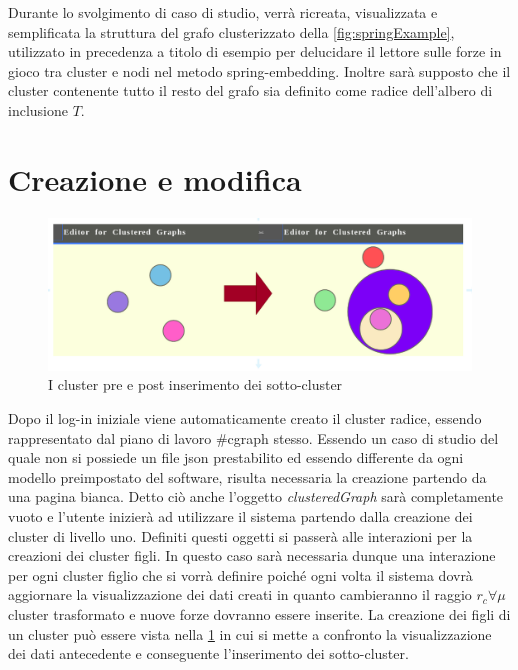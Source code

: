 \large{
Durante lo svolgimento di caso di studio, verrà ricreata, visualizzata e semplificata la struttura del grafo clusterizzato della \figurename{\ref{fig:springExample}}, utilizzato in precedenza a titolo di esempio per delucidare il lettore sulle forze in gioco tra cluster e nodi nel metodo spring-embedding. Inoltre sarà supposto che il cluster contenente tutto il resto del grafo sia definito come radice dell'albero di inclusione $T$.

\section{Creazione e modifica}
\begin{figure}[!htb]
	\begin{center}
		\includegraphics[width=1 \linewidth]{figure/prePostEdit}
	\end{center}
	\caption{I cluster pre e post inserimento dei sotto-cluster \label{fig:prePostEdit}}
\end{figure}
Dopo il log-in iniziale viene automaticamente creato il cluster radice, essendo rappresentato dal piano di lavoro \#cgraph stesso. Essendo un caso di studio del quale non si possiede un file json prestabilito ed essendo differente da ogni modello preimpostato del software, risulta necessaria la creazione partendo da una pagina bianca. Detto ciò anche l'oggetto \textit{clusteredGraph} sarà completamente vuoto e l'utente inizierà ad utilizzare il sistema partendo dalla creazione dei cluster di livello uno. Definiti questi oggetti si passerà alle interazioni per la creazioni dei cluster figli. In questo caso sarà necessaria dunque una interazione per ogni cluster figlio che si vorrà definire poiché ogni volta il sistema dovrà aggiornare la visualizzazione dei dati creati in quanto cambieranno il raggio $r_c \forall \mu$ cluster trasformato e nuove forze dovranno essere inserite. La creazione dei figli di un cluster può essere vista nella \figurename{\ref{fig:prePostEdit}} in cui si mette a confronto la visualizzazione dei dati antecedente e conseguente l'inserimento dei sotto-cluster. 
}

